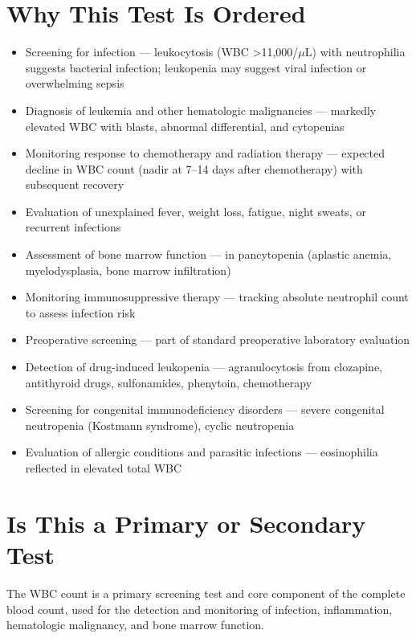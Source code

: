 \section*{Why This Test Is Ordered}
\begin{itemize}
  \item Screening for infection --- leukocytosis (WBC >11,000/$\mu$L) with neutrophilia suggests bacterial infection; leukopenia may suggest viral infection or overwhelming sepsis
  \item Diagnosis of leukemia and other hematologic malignancies --- markedly elevated WBC with blasts, abnormal differential, and cytopenias
  \item Monitoring response to chemotherapy and radiation therapy --- expected decline in WBC count (nadir at 7--14 days after chemotherapy) with subsequent recovery
  \item Evaluation of unexplained fever, weight loss, fatigue, night sweats, or recurrent infections
  \item Assessment of bone marrow function --- in pancytopenia (aplastic anemia, myelodysplasia, bone marrow infiltration)
  \item Monitoring immunosuppressive therapy --- tracking absolute neutrophil count to assess infection risk
  \item Preoperative screening --- part of standard preoperative laboratory evaluation
  \item Detection of drug-induced leukopenia --- agranulocytosis from clozapine, antithyroid drugs, sulfonamides, phenytoin, chemotherapy
  \item Screening for congenital immunodeficiency disorders --- severe congenital neutropenia (Kostmann syndrome), cyclic neutropenia
  \item Evaluation of allergic conditions and parasitic infections --- eosinophilia reflected in elevated total WBC
\end{itemize}

\section*{Is This a Primary or Secondary Test}
The WBC count is a primary screening test and core component of the complete blood count, used for the detection and monitoring of infection, inflammation, hematologic malignancy, and bone marrow function.

